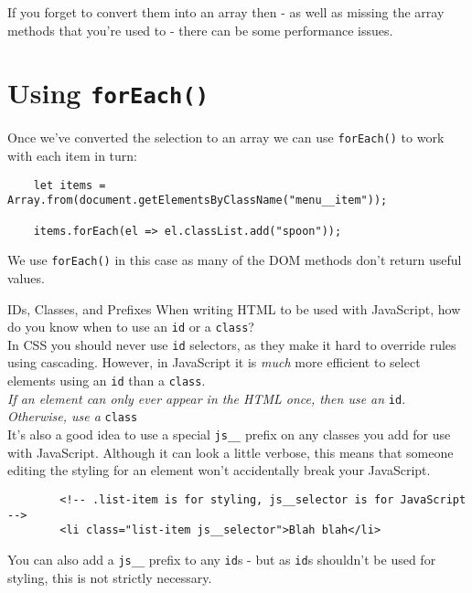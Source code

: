 If you forget to convert them into an array then - as well as missing the array methods that you're used to - there can be some performance issues.


\section{Using \texttt{forEach()}}

Once we've converted the selection to an array we can use \texttt{forEach()} to work with each item in turn:

\begin{verbatim}
    let items = Array.from(document.getElementsByClassName("menu__item"));

    items.forEach(el => el.classList.add("spoon"));
\end{verbatim}

We use \texttt{forEach()} in this case as many of the DOM methods don't return useful values.

\pagebreak


\begin{infobox}{IDs, Classes, and Prefixes}
    When writing HTML to be used with JavaScript, how do you know when to use an \texttt{id} or a \texttt{class}?
    \\

    In CSS you should never use \texttt{id} selectors, as they make it hard to override rules using cascading. However, in JavaScript it is \textit{much} more efficient to select elements using an \texttt{id} than a \texttt{class}.
    \\

    \textit{If an element can only ever appear in the HTML once, then use an} \texttt{id}. \textit{Otherwise, use a} \texttt{class}
    \\

    It's also a good idea to use a special \texttt{js\_\_} prefix on any classes you add for use with JavaScript. Although it can look a little verbose, this means that someone editing the styling for an element won't accidentally break your JavaScript.

    \begin{verbatim}
        <!-- .list-item is for styling, js__selector is for JavaScript -->
        <li class="list-item js__selector">Blah blah</li>
    \end{verbatim}

    You can also add a \texttt{js\_\_} prefix to any \texttt{id}s - but as \texttt{id}s shouldn't be used for styling, this is not strictly necessary.
\end{infobox}



